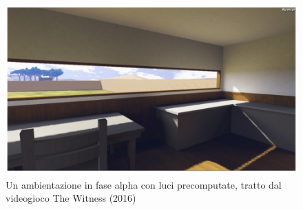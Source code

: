 \\
\begin{figure}[htb]
 \centering
 \includegraphics[width=0.8\linewidth]{images/chapter_stato_arte/stato_arte_lightmap_witness.png}\hfill
 \caption[Lightmap The Witness]{Un ambientazione in fase alpha con luci precomputate, tratto dal videogioco The Witness (2016)}
 \label{fig:stato_arte_lightmap_witness}
\end{figure}
